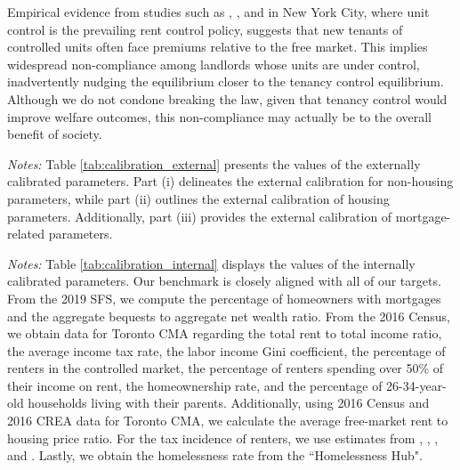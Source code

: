 \documentclass[parskip=full]{article}
\newenvironment{fignote2}[1]
{
\par
\medskip
\begin{minipage}{#1}
\footnotesize
}
{
\end{minipage}
}
\begin{document}
Empirical evidence from studies such as \citet{nagy-1997}, \citet{early-2000}, and \citet{cjq-2023} in New York City, where unit control is the prevailing rent control policy, suggests that new tenants of controlled units often face premiums relative to the free market. This implies widespread non-compliance among landlords whose units are under control, inadvertently nudging the equilibrium closer to the tenancy control equilibrium. Although we do not condone breaking the law, given that tenancy control would improve welfare outcomes, this non-compliance may actually be to the overall benefit of society.




\vspace{1cm}
    
\begin{table}[H]
    \centering
    \caption{Externally assigned parameter values}
    \vspace{-1.25cm}
    \label{tab:calibration_external}
    
    \vspace{-0.5cm}
    \begin{fignote2}{1.11\textwidth}
    \textit{Notes:} Table \ref{tab:calibration_external} presents the values of the externally calibrated parameters. Part (i) delineates the external calibration for non-housing parameters, while part (ii) outlines the external calibration of housing parameters. Additionally, part (iii) provides the external calibration of mortgage-related parameters.
    \end{fignote2}
\end{table}

\begin{table}[H]
    \centering
    \caption{Internally assigned parameter values}
    \vspace{-1.25cm}
    \label{tab:calibration_internal}
    
    \vspace{-0.5cm}
    \begin{fignote2}{1.08\textwidth}
    \textit{Notes:} Table \ref{tab:calibration_internal} displays the values of the internally calibrated parameters. Our benchmark is closely aligned with all of our targets. From the 2019 SFS, we compute the percentage of homeowners with mortgages and the aggregate bequests to aggregate net wealth ratio. From the 2016 Census, we obtain data for Toronto CMA regarding the total rent to total income ratio, the average income tax rate, the labor income Gini coefficient, the percentage of renters in the controlled market, the percentage of renters spending over 50\% of their income on rent, the homeownership rate, and the percentage of 26-34-year-old households living with their parents. Additionally, using 2016 Census and 2016 CREA data for Toronto CMA, we calculate the average free-market rent to housing price ratio. For the tax incidence of renters, we use estimates from \citet{cy-1994}, \citet{susin-2002}, \citet{fack-2006}, and \citet{sy-2020}. Lastly, we obtain the homelessness rate from the ``Homelessness Hub".
    \end{fignote2}
\end{table}
\end{document}
